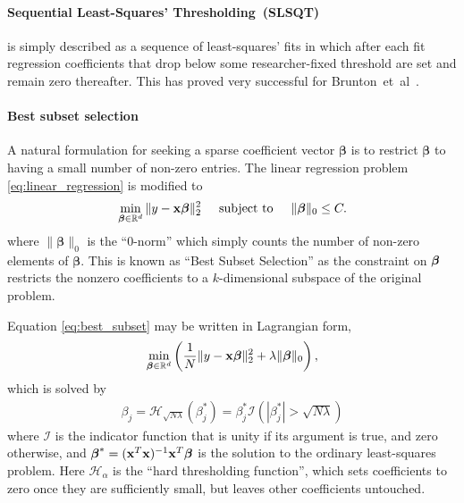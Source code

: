 \paragraph{Sequential Least-Squares' Thresholding~(SLSQT)} is simply described 
as a sequence of least-squares' fits in which after each fit
regression coefficients that drop below some researcher-fixed threshold are set and
remain zero thereafter.
This has proved very successful for Brunton~et~al~\cite{Br16Disc}.

\paragraph{Best subset selection}
A natural formulation for seeking a sparse coefficient vector $\boldsymbol{\beta}$
is to restrict $\boldsymbol{\beta}$ to having a small number of non-zero entries.
The linear regression problem \eqref{eq:linear_regression} is modified to 
\begin{align}
	\label{eq:best_subset}
\min_{\boldsymbol{\beta}\in \mathbb{R}^d}\|y - \mathbf{x}\boldsymbol{\beta}\|^2_2
	\hspace{0.5cm}
	\mathrm{subject\ to}
	\hspace{0.5cm}
	\|\boldsymbol{\beta}\|_0 \leq C.
\end{align}
where $\|\boldsymbol{\beta}\|_0$ is the ``0-norm'' which simply counts the number of non-zero elements of $\boldsymbol{\beta}$.
This is known as ``Best Subset Selection''
as the constraint on $\boldsymbol{\beta}$ restricts the nonzero coefficients to a $k$-dimensional subspace of the original problem.

Equation \eqref{eq:best_subset} may be written in Lagrangian form,
\begin{align}
	\label{eq:best_subset_lagrangian_form}
	\min_{\boldsymbol{\beta}\in \mathbb{R}^d}\left( \frac{1}{N}\|y - \mathbf{x}\boldsymbol{\beta}\|^2_2 + \lambda \|\boldsymbol{\beta}\|_0 \right),
\end{align}
which is solved by 
\begin{align}
	\beta_j 
	= \mathcal{H}_{\sqrt{N\lambda}}(\beta^*_j) 
	= \beta^*_j \mathcal{I}\left(|\beta_j^*|>\sqrt{N\lambda}\right)
\end{align}
where $\mathcal{I}$ is the indicator function that is unity if its argument is true, and zero otherwise, and $\boldsymbol{\beta}^*=(\mathbf{x}^T\mathbf{x})^{-1}\mathbf{x}^T\boldsymbol{\beta}$ is the solution to the ordinary least-squares problem.
Here $\mathcal{H}_{\alpha}$ is the ``hard thresholding function'', which sets
coefficients to zero once they are sufficiently small, but leaves other
coefficients untouched.

